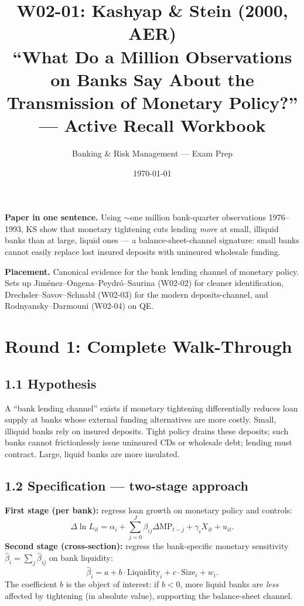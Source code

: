 \documentclass[11pt]{article}
\title{W02-01: Kashyap \& Stein (2000, AER) \\
\large ``What Do a Million Observations on Banks Say About the Transmission of Monetary Policy?'' --- Active Recall Workbook}
\author{Banking \& Risk Management --- Exam Prep}
\date{\today}
\begin{document}
\maketitle

\begin{keybox}
\textbf{Paper in one sentence.} Using $\sim$one million bank-quarter observations 1976--1993, KS show that monetary tightening cuts lending \emph{more} at small, illiquid banks than at large, liquid ones --- a balance-sheet-channel signature: small banks cannot easily replace lost insured deposits with uninsured wholesale funding.

\textbf{Placement.} Canonical evidence for the bank lending channel of monetary policy. Sets up Jim\'enez--Ongena--Peydr\'o--Saurina (W02-02) for cleaner identification, Drechsler--Savov--Schnabl (W02-03) for the modern deposits-channel, and Rodnyansky--Darmouni (W02-04) on QE.
\end{keybox}

\section*{Round 1: Complete Walk-Through}

\subsection*{1.1 Hypothesis}
A ``bank lending channel'' exists if monetary tightening differentially reduces loan supply at banks whose external funding alternatives are more costly. Small, illiquid banks rely on insured deposits. Tight policy drains these deposits; such banks cannot frictionlessly issue uninsured CDs or wholesale debt; lending must contract. Large, liquid banks are more insulated.

\subsection*{1.2 Specification --- two-stage approach}
\textbf{First stage (per bank):} regress loan growth on monetary policy and controls:
\[
\Delta \ln L_{it} = \alpha_i + \sum_{j=0}^{J}\beta_{ij}\Delta \mathrm{MP}_{t-j} + \gamma_i X_{it} + u_{it}.
\]
\textbf{Second stage (cross-section):} regress the bank-specific monetary sensitivity $\hat\beta_i=\sum_j\hat\beta_{ij}$ on bank liquidity:
\[
\hat\beta_i = a + b\cdot\text{Liquidity}_i + c\cdot\text{Size}_i + w_i.
\]
The coefficient $b$ is the object of interest: if $b<0$, more liquid banks are \emph{less} affected by tightening (in absolute value), supporting the balance-sheet channel.
\end{document}

